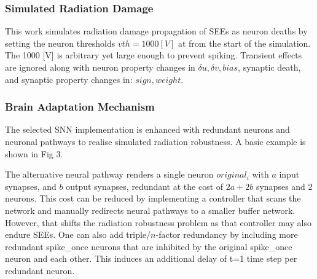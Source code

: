 \subsubsection*{Simulated Radiation Damage}\label{subsubsec:simulated_radiation_damage}
This work simulates radiation damage propagation of SEEs as neuron deaths by setting the neuron thresholds $vth=1000 [V]$ at from the start of the simulation. The 1000 [V] is arbitrary yet large enough to prevent spiking. Transient effects are ignored along with neuron property changes in $\delta u,\delta v, bias$, synaptic death, and synaptic property changes in: $sign,weight$.

\subsubsection*{Brain Adaptation Mechanism}\label{subsubsec:brain_adaptation_mechanisms}
The selected SNN implementation is enhanced with redundant neurons and neuronal pathways to realise simulated radiation robustness. A basic example is shown in Fig 3.

The alternative neural pathway renders a single neuron $original_i$ with $a$ input synapses, and $b$ output synapses, redundant at the cost of $2a+2b$ synapses and 2 neurons. This cost can be reduced by implementing a controller that scans the network and manually redirects neural pathways to a smaller buffer network. However, that shifts the radiation robustness problem as that controller may also endure SEEs. %
One can also add triple/$n$-factor redundancy by including more redundant spike\_once neurons that are inhibited by the original spike\_once neuron and each other. This induces an additional delay of t=1 time step per redundant neuron.

